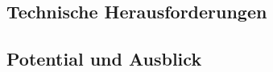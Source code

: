 \subsection{Technische Herausforderungen}\label{sec:VRHerausforderungen}


\subsection{Potential und Ausblick}\label{sec:VRPotentialUndAusblick}





